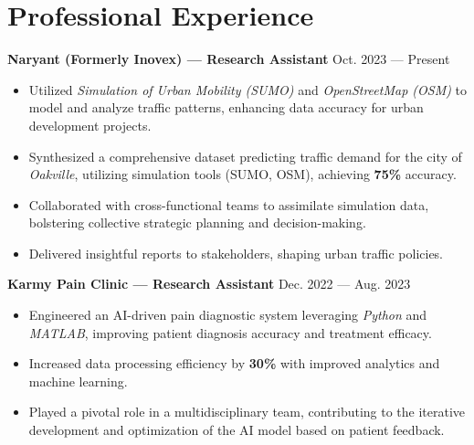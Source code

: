 \documentclass[a4paper, 12pt]{article}
\begin{document}
\section{Professional Experience}

\textcolor{imptextblack}{\textbf{Naryant (Formerly Inovex) --- Research Assistant}} \hfill Oct. 2023 --- Present
\begin{itemize}[nosep, after=\strut, itemsep=2pt]
    \item Utilized \textcolor{imptextblack}{\textit{Simulation of Urban Mobility (SUMO)}}
          and \textcolor{imptextblack}{\textit{OpenStreetMap (OSM)}} to model and analyze
          traffic patterns, enhancing data accuracy for urban development projects.
    \item Synthesized a comprehensive dataset predicting traffic demand for the city of
          \textcolor{imptextblack}{\textit{Oakville}}, utilizing simulation tools (SUMO,
          OSM), achieving \textcolor{imptextblack}{\textbf{75\%}} accuracy.
    \item Collaborated with cross-functional teams to assimilate simulation data,
          bolstering collective strategic planning and decision-making.
    \item Delivered insightful reports to stakeholders, shaping urban traffic policies.
\end{itemize}

\textcolor{imptextblack}{\textbf{Karmy Pain Clinic --- Research Assistant}} \hfill Dec. 2022 --- Aug. 2023
\begin{itemize}[nosep, after=\strut, itemsep=2pt]
    \item Engineered an AI-driven pain diagnostic system leveraging
          \textcolor{imptextblack}{\textit{Python}} and
          \textcolor{imptextblack}{\textit{MATLAB}}, improving patient diagnosis accuracy
          and treatment efficacy.
    \item Increased data processing efficiency by \textcolor{imptextblack}{\textbf{30\%}}
          with improved analytics and machine learning.
    \item Played a pivotal role in a multidisciplinary team, contributing to the
          iterative development and optimization of the AI model based on patient
          feedback.
\end{itemize}

\end{document}

